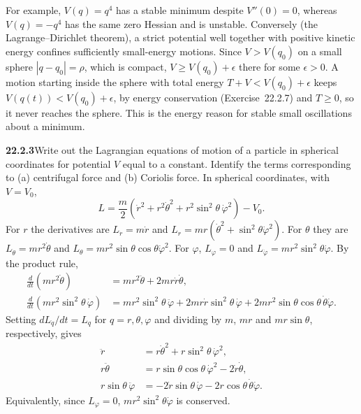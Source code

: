 For example, $V(q)=q^4$ has a stable minimum despite $V''(0)=0$,
whereas $V(q)=-q^4$ has the same zero Hessian and is unstable.
Conversely (the Lagrange--Dirichlet theorem), a strict potential well
together with positive kinetic energy confines sufficiently small-energy
motions. Since $V>V(q_0)$ on a small sphere $|q-q_0|=\rho$, which is
compact, $V\ge V(q_0)+\epsilon$ there for some $\epsilon>0$. A motion
starting inside the sphere with total energy $T+V<V(q_0)+\epsilon$
keeps $V(q(t))<V(q_0)+\epsilon$, by energy conservation
(Exercise~22.2.7) and $T\ge0$, so it never reaches the sphere.
This is the energy reason for stable small oscillations about a minimum.


\par\bigskip
\noindent\textbf{22.2.3}\quad Write out the Lagrangian equations
of motion of a particle in spherical coordinates for potential
$V$ equal to a constant. Identify the terms corresponding to
(a) centrifugal force and (b) Coriolis force.
\solution
In spherical coordinates, with $V=V_0$,
\[
L=\frac m2\left(\dot r^2+r^2\dot\theta^2+
r^2\sin^2\theta\,\dot\varphi^2\right)-V_0.
\]
For $r$ the derivatives are
$L_{\dot r}=m\dot r$ and
$L_r=mr(\dot\theta^2+\sin^2\theta\dot\varphi^2)$.
For $\theta$ they are
$L_{\dot\theta}=mr^2\dot\theta$ and
$L_\theta=mr^2\sin\theta\cos\theta\dot\varphi^2$.
For $\varphi$, $L_\varphi=0$ and
$L_{\dot\varphi}=mr^2\sin^2\theta\dot\varphi$.
By the product rule,
\[
\begin{aligned}
\frac d{dt}(mr^2\dot\theta)&=mr^2\ddot\theta+2mr\dot r\dot\theta,\\
\frac d{dt}(mr^2\sin^2\theta\,\dot\varphi)
&=mr^2\sin^2\theta\,\ddot\varphi+2mr\dot r\sin^2\theta\,\dot\varphi
+2mr^2\sin\theta\cos\theta\,\dot\theta\dot\varphi.
\end{aligned}
\]
Setting $dL_{\dot q}/dt=L_q$ for $q=r,\theta,\varphi$ and dividing by
$m$, $mr$ and $mr\sin\theta$, respectively, gives
\[
\boxed{\begin{aligned}
\ddot r&=r\dot\theta^2+r\sin^2\theta\,\dot\varphi^2,\\
r\ddot\theta&=r\sin\theta\cos\theta\,\dot\varphi^2
-2\dot r\dot\theta,\\
r\sin\theta\,\ddot\varphi
&=-2\dot r\sin\theta\,\dot\varphi
-2r\cos\theta\,\dot\theta\dot\varphi.
\end{aligned}}
\]
Equivalently, since $L_\varphi=0$, $mr^2\sin^2\theta\dot\varphi$ is
conserved.

